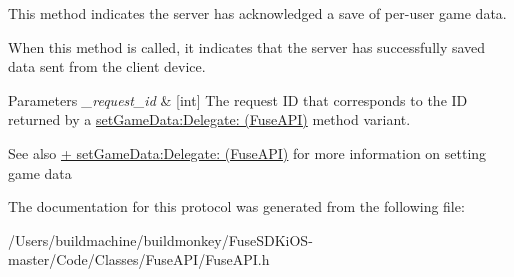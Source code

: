 This method indicates the server has acknowledged a save of per-\/user game data. 

When this method is called, it indicates that the server has successfully saved data sent from the client device. 
\begin{DoxyParams}{Parameters}
{\em \+\_\+request\+\_\+id} & \mbox{[}int\mbox{]} The request I\+D that corresponds to the I\+D returned by a \hyperlink{interface_fuse_a_p_i_a3da637831ec4d7dcd4d45cd7c547cd6a}{set\+Game\+Data\+:\+Delegate\+: (\+Fuse\+A\+P\+I)} method variant. \\
\hline
\end{DoxyParams}
\begin{DoxySeeAlso}{See also}
\hyperlink{interface_fuse_a_p_i_a3da637831ec4d7dcd4d45cd7c547cd6a}{+ set\+Game\+Data\+:\+Delegate\+: (\+Fuse\+A\+P\+I)} for more information on setting game data 
\end{DoxySeeAlso}


The documentation for this protocol was generated from the following file\+:\begin{DoxyCompactItemize}
\item 
/\+Users/buildmachine/buildmonkey/\+Fuse\+S\+D\+Ki\+O\+S-\/master/\+Code/\+Classes/\+Fuse\+A\+P\+I/Fuse\+A\+P\+I.\+h\end{DoxyCompactItemize}

